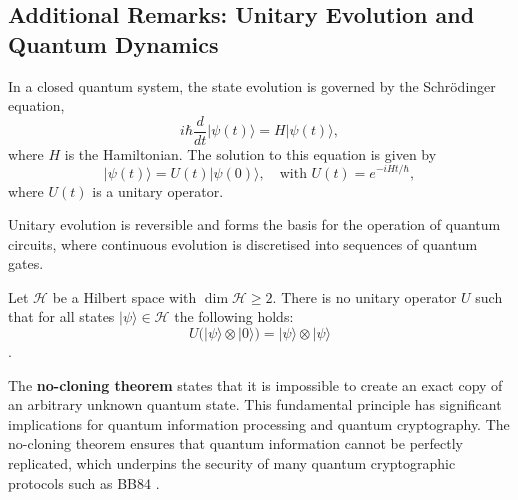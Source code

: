 
\subsection{Additional Remarks: Unitary Evolution and Quantum Dynamics}
\label{subsec:unitary_evolution}

\begin{definition}
In a closed quantum system, the state evolution is governed by the Schrödinger equation,
\[
i\hbar \frac{d}{dt} |\psi(t)\rangle = H |\psi(t)\rangle,
\]
where \(H\) is the Hamiltonian. The solution to this equation is given by
\[
|\psi(t)\rangle = U(t)|\psi(0)\rangle, \quad \text{with } U(t)=e^{-iHt/\hbar},
\]
where \(U(t)\) is a unitary operator.
\end{definition}

\begin{remark}
Unitary evolution is reversible and forms the basis for the operation of quantum circuits, where continuous evolution is discretised into sequences of quantum gates.
\end{remark}

\begin{theorem}
    Let \(\mathcal{H}\) be a Hilbert space with \(\dim \mathcal{H} \ge 2\). There is no unitary operator \(U\) such that for all states \(|\psi\rangle \in \mathcal{H}\) the following holds:
    \[
    U\big(|\psi\rangle \otimes |0\rangle\big) = |\psi\rangle \otimes |\psi\rangle
    \]\cite{wootters1982single}.
\end{theorem}

\begin{observation}
    The \textbf{no-cloning theorem} states that it is impossible to create an exact copy of an arbitrary unknown quantum state. This fundamental principle has significant implications for quantum information processing and quantum cryptography.
    The no-cloning theorem ensures that quantum information cannot be perfectly replicated, which underpins the security of many quantum cryptographic protocols such as BB84 \cite{bennett1984quantum}.
\end{observation}